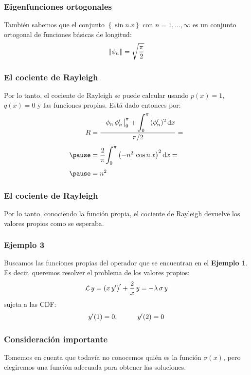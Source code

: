 \documentclass[12pt]{beamer}
\begin{document}
\begin{frame}
\frametitle{Eigenfunciones ortogonales}
También sabemos que el conjunto $\left\{ \sin n \, x \right\}$ con $n = 1, \ldots, \infty$ es un conjunto ortogonal de funciones básicas de longitud:
\pause
\begin{align*}
\norm{\phi_{n}} = \sqrt{\dfrac{\pi}{2}}
\end{align*}
\end{frame}
\begin{frame}
\frametitle{El cociente de Rayleigh}
Por lo tanto, el cociente de Rayleigh se puede calcular usando $p(x) = 1$, $q (x) = 0$ y las funciones propias. \pause Está dado entonces por:
\pause
\begin{eqnarray}
\begin{aligned}[b]
R &= \dfrac{- \phi_{n} \, \pderivada{\phi}_{n} \eval_{0}^{\pi} + \scaleint{6ex}_{\bs 0}^{\pi} \, (\pderivada{\phi}_{n})^{2} \dd{x}}{\pi/2} = \\[0.35em] \pause
&= \dfrac{2}{\pi} \scaleint{6ex}_{\bs 0}^{\pi} \left( - n^{2} \, \cos n \, x \right)^{2} \dd{x} = \\[0.35em] \pause
&= n^{2}
\end{aligned}
\label{eq:ecuacion_04_13}
\end{eqnarray}
\end{frame}
\begin{frame}
\frametitle{El cociente de Rayleigh}
Por lo tanto, conociendo la función propia, el cociente de Rayleigh devuelve los valores propios como se esperaba.
\end{frame}
\begin{frame}
\frametitle{Ejemplo 3}
Buscamos las funciones propias del operador que se encuentran en el \textbf{Ejemplo 1}. 
\\
\bigskip
\pause
Es decir, queremos resolver el problema de los valores propios:\
\pause
\begin{align}
\mathcal{L} \, y = \left( x \, {y}^{\prime} \right)^{\prime} + \dfrac{2}{x} \, y = - \lambda \, \sigma \, y
\label{eq:ecuacion_04_14}
\end{align}
sujeta a las CDF:
\begin{align*}
{y}^{\prime} (1) = 0, \hspace{1cm} {y}^{\prime}(2) = 0
\end{align*}
\end{frame}
\begin{frame}
\frametitle{Consideración importante}
Tomemos en cuenta que todavía no conocemos quién es la función $\sigma (x)$, pero elegiremos una función adecuada para obtener las soluciones.
\end{frame}
\end{document}
